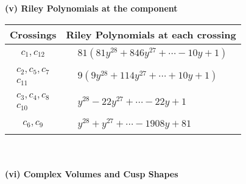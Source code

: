 \documentclass[1p]{elsarticle_modified}
\theoremstyle{definition}
\begin{document}
\flushleft \textbf{(v) Riley Polynomials at the component}\newline \\
\begin{tabular}{m{50pt}|m{274pt}}
Crossings & \hspace{64pt}Riley Polynomials at each crossing \\
\hline $$\begin{aligned}c_{1},c_{12}\end{aligned}$$&$\begin{aligned}
&81(81 y^{28}+846 y^{27}+\cdots-10 y+1)
\end{aligned}$\\
\hline $$\begin{aligned}c_{2},c_{5},c_{7}\\c_{11}\end{aligned}$$&$\begin{aligned}
&9(9 y^{28}+114 y^{27}+\cdots+10 y+1)
\end{aligned}$\\
\hline $$\begin{aligned}c_{3},c_{4},c_{8}\\c_{10}\end{aligned}$$&$\begin{aligned}
&y^{28}-22 y^{27}+\cdots-22 y+1
\end{aligned}$\\
\hline $$\begin{aligned}c_{6},c_{9}\end{aligned}$$&$\begin{aligned}
&y^{28}+y^{27}+\cdots-1908 y+81
\end{aligned}$\\
\hline
\end{tabular}\\~\\
\newpage\flushleft \textbf{(vi) Complex Volumes and Cusp Shapes}
\end{document}
